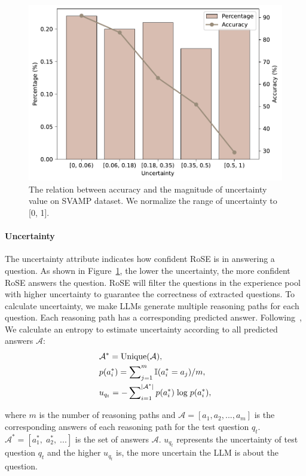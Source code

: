 \documentclass[11pt]{article}
\begin{document}
\begin{figure}[ht]
    \centering
    \includegraphics[width=\linewidth]{pics/uncertainty.pdf}
    \caption{The relation between accuracy and the magnitude of uncertainty value on SVAMP dataset. We normalize the range of uncertainty to [0, 1].}
    \label{fig:uncertainty}
\end{figure}

\paragraph{Uncertainty} The uncertainty attribute indicates how confident RoSE is in answering a question. As shown in Figure~\ref{fig:uncertainty}, the lower the uncertainty, the more confident RoSE answers the question. RoSE will filter the questions in the experience pool with higher uncertainty to guarantee the correctness of extracted questions. To calculate uncertainty, we make LLMs generate multiple reasoning paths for each question. Each reasoning path has a corresponding predicted answer. Following~\citet{li2023mot}, We calculate an entropy to estimate uncertainty according to all predicted answers $\mathcal{A}$:
\begin{align}
    & \mathcal{A}^* = \rm Unique(\mathcal{A}), \\
    & p(a_i^*) = \sum\nolimits_{j=1}^{m} \mathbb{I}(a_i^* = a_j) / m, \\
    & u_{q_t} = -\sum\nolimits_{i=1}^{\left| \mathcal{A}^* \right|} p(a_i^*)\; {\rm log} \;p(a_i^*),
\end{align}

where $m$ is the number of reasoning paths and $\mathcal{A} = [a_1, a_2, ..., a_m]$ is the corresponding answers of each reasoning path for the test question $q_t$. $\mathcal{A}^* = [a_1^*,\;a_2^*,\;...]$ is the set of answers $\mathcal{A}$. $u_{q_t}$ represents the uncertainty of test question $q_t$ and the higher $u_{q_t}$ is, the more uncertain the LLM is about the question. 
\end{document}
